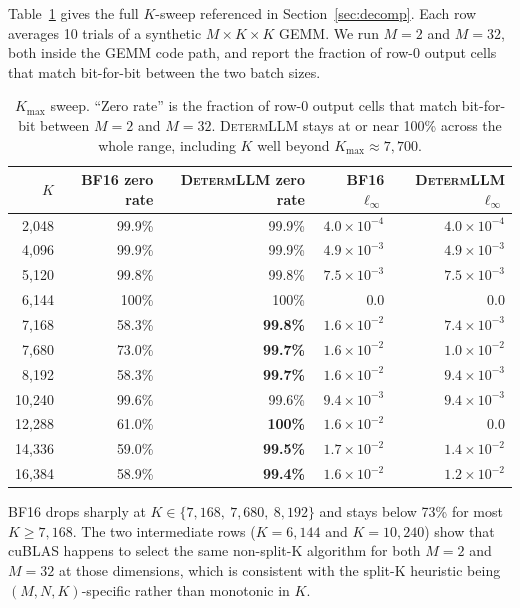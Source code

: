 \documentclass{article}
\newcommand{\dllm}{\textsc{DetermLLM}\xspace}
\begin{document}
Table~\ref{tab:kmax_sweep} gives the full $K$-sweep referenced in
Section~\ref{sec:decomp}. Each row averages 10 trials of a synthetic
$M\!\times\!K\!\times\!K$ GEMM. We run $M\!=\!2$ and $M\!=\!32$, both inside the
GEMM code path, and report the fraction of row-0 output cells that match
bit-for-bit between the two batch sizes.

\begin{table}[h]
\centering
\caption{$K_{\max}$ sweep. ``Zero rate'' is the fraction of row-0 output cells
  that match bit-for-bit between $M\!=\!2$ and $M\!=\!32$. \dllm stays at or near
  100\% across the whole range, including $K$ well beyond $K_{\max}\!\approx\!7{,}700$.}
\label{tab:kmax_sweep}
\begin{tabular}{rrrrr}
\toprule
$K$ & BF16 zero rate & \dllm zero rate & BF16 $\ell_\infty$ & \dllm $\ell_\infty$ \\
\midrule
2{,}048  & 99.9\% & 99.9\%  & $4.0\!\times\!10^{-4}$ & $4.0\!\times\!10^{-4}$ \\
4{,}096  & 99.9\% & 99.9\%  & $4.9\!\times\!10^{-3}$ & $4.9\!\times\!10^{-3}$ \\
5{,}120  & 99.8\% & 99.8\%  & $7.5\!\times\!10^{-3}$ & $7.5\!\times\!10^{-3}$ \\
6{,}144  & 100\phantom{.0}\% & 100\phantom{.0}\%  & $0.0$ & $0.0$ \\
7{,}168  & 58.3\% & \textbf{99.8\%} & $1.6\!\times\!10^{-2}$ & $7.4\!\times\!10^{-3}$ \\
7{,}680  & 73.0\% & \textbf{99.7\%} & $1.6\!\times\!10^{-2}$ & $1.0\!\times\!10^{-2}$ \\
8{,}192  & 58.3\% & \textbf{99.7\%} & $1.6\!\times\!10^{-2}$ & $9.4\!\times\!10^{-3}$ \\
10{,}240 & 99.6\% & 99.6\%  & $9.4\!\times\!10^{-3}$ & $9.4\!\times\!10^{-3}$ \\
12{,}288 & 61.0\% & \textbf{100\phantom{.0}\%} & $1.6\!\times\!10^{-2}$ & $0.0$ \\
14{,}336 & 59.0\% & \textbf{99.5\%} & $1.7\!\times\!10^{-2}$ & $1.4\!\times\!10^{-2}$ \\
16{,}384 & 58.9\% & \textbf{99.4\%} & $1.6\!\times\!10^{-2}$ & $1.2\!\times\!10^{-2}$ \\
\bottomrule
\end{tabular}
\end{table}

BF16 drops sharply at $K\!\in\!\{7{,}168,\ 7{,}680,\ 8{,}192\}$ and stays below
73\% for most $K\!\ge\!7{,}168$. The two intermediate rows ($K\!=\!6{,}144$ and
$K\!=\!10{,}240$) show that cuBLAS happens to select the same non-split-K
algorithm for both $M\!=\!2$ and $M\!=\!32$ at those dimensions, which is
consistent with the split-K heuristic being $(M,N,K)$-specific rather than
monotonic in $K$.
\end{document}
